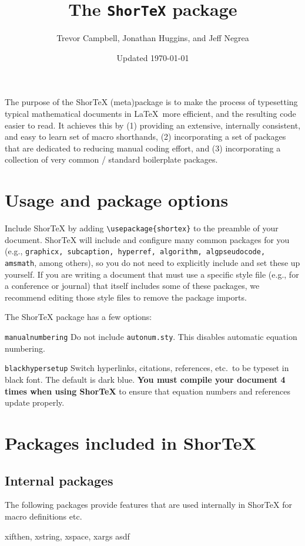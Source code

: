 \documentclass{article}
\title{The \texttt{ShorTeX} package}
\author{Trevor Campbell, Jonathan Huggins, and Jeff Negrea}
\date{Updated \today}
\begin{document}
\maketitle


\babs
The purpose of the ShorTeX (meta)package is to make the process of typesetting
typical mathematical documents in \LaTeX~more efficient, and the resulting
code easier to read.  It achieves this by 
(1) providing an
extensive, internally consistent, and easy to learn set of macro
shorthands, 
(2) incorporating a set of packages that are
dedicated to reducing manual coding effort, and
(3) incorporating a collection of very common / standard boilerplate packages.
\eabs


\tableofcontents

\section{Usage and package options}\label{sec:usage}


Include ShorTeX by adding \verb!\usepackage{shortex}! to the preamble of your document.
ShorTeX will include and configure many common packages for you (e.g., \texttt{graphicx, subcaption, hyperref, algorithm, algpseudocode, amsmath}, among others),
so you do not need to explicitly include and set these up yourself.
If you are writing a document that must use a specific style file (e.g., for a conference or journal) that itself
includes some of these packages, we recommend editing those style files to remove the package imports.

The ShorTeX package has a few options:
\bdesc
\item[\texttt{manualnumbering}] Do not include \texttt{autonum.sty}. This disables automatic equation numbering.
\item[\texttt{blackhypersetup}] Switch hyperlinks, citations, references, etc.~to be typeset in black font. The default is dark blue.
\edesc
\textbf{You must compile your document 4 times when using ShorTeX} to ensure that equation
numbers and references update properly.

\section{Packages included in ShorTeX}
\subsection{Internal packages}
The following packages provide features that are used internally in ShorTeX for 
macro definitions etc.
\bdesc
\item[xifthen, xstring, xspace, xargs] asdf
\edesc
\end{document}
